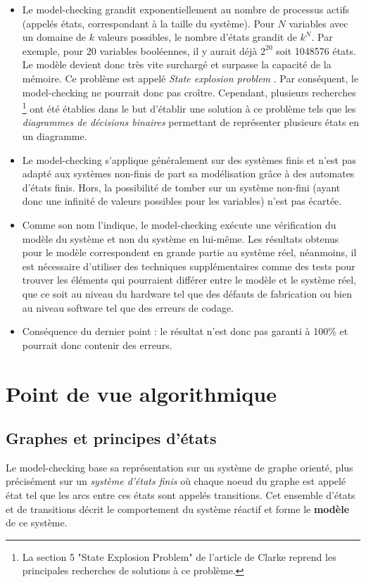 \documentclass[runningheads,a4paper,10pt]{llncs}
\begin{document}
\begin{itemize}
\item Le model-checking grandit exponentiellement au nombre de processus actifs (appelés états, correspondant à la taille du système). Pour $N$ variables avec un domaine de $k$ valeurs possibles, le nombre d'états grandit de $k^{N}$. Par exemple, pour 20 variables booléennes, il y aurait déjà $2^{20}$ soit 1048576 états. Le modèle devient donc très vite surchargé et surpasse la capacité de la mémoire. Ce problème est appelé \textit{State explosion problem} \cite{StateExpProb}. Par conséquent, le model-checking ne pourrait donc pas croître. Cependant, plusieurs recherches \footnote{La section 5 "State Explosion Problem" de l'article de Clarke \cite{StateExpProb} reprend les principales recherches de solutions à ce problème.} ont été établies dans le but d'établir une solution à ce problème tels que les \textit{diagrammes de décisions binaires} permettant de représenter plusieurs états en un diagramme. 
\item Le model-checking s'applique généralement sur des systèmes finis et n'est pas adapté aux systèmes non-finis de part sa modélisation grâce à des automates d'états finis. Hors, la possibilité de tomber sur un système non-fini (ayant donc une infinité de valeurs possibles pour les variables) n'est pas écartée. %
\item Comme son nom l'indique, le model-checking exécute une vérification du modèle du système et non du système en lui-même. Les résultats obtenus pour le modèle correspondent en grande partie au système réel, néanmoins, il est nécessaire d'utiliser des techniques supplémentaires comme des tests pour trouver les éléments qui pourraient différer entre le modèle et le système réel, que ce soit au niveau du hardware tel que des défauts de fabrication ou bien au niveau software tel que des erreurs de codage. 
\item Conséquence du dernier point : le résultat n'est donc pas garanti à 100\% et pourrait donc contenir des erreurs. 
\end{itemize}

\section{Point de vue algorithmique} \label{sec:pdv-algo}

\subsection{Graphes et principes d'états}
Le model-checking base sa représentation sur un système de graphe orienté, plus précisément sur un \textit{système d'états finis} où chaque noeud du graphe est appelé état tel que les arcs entre ces états sont appelés transitions. Cet ensemble d'états et de transitions décrit le comportement du système réactif et forme le \textbf{modèle} de ce système. \\
\end{document}
